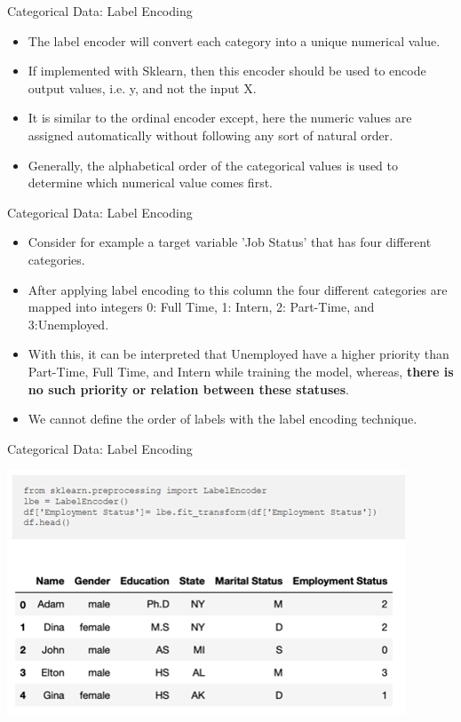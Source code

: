 \documentclass[11pt]{beamer}
\begin{document}
\begin{frame}{Categorical Data: Label Encoding}
	\begin{itemize}
		\item The label encoder will convert each category into a unique numerical value. 
		\item If implemented with Sklearn, then this encoder should be used to encode output values, i.e. y, and not the input X. 
		\item It is similar to the ordinal encoder except, here the numeric values are assigned automatically without following any sort of natural order. 
		\item Generally, the alphabetical order of the categorical values is used to determine which numerical value comes first. 
	\end{itemize}
\end{frame}
\begin{frame}{Categorical Data: Label Encoding}
	\begin{itemize}
		\item Consider for example a target variable 'Job Status' that has four different categories. 
		\item After applying label encoding to this column the four different categories are mapped into integers 0: Full Time, 1: Intern, 2: Part-Time, and 3:Unemployed. 
		\item With this, it can be interpreted that Unemployed have a higher priority than Part-Time, Full Time, and Intern while training the model, whereas, \textbf{there is no such priority or relation between these statuses}. 
		\item We cannot define the order of labels with the label encoding technique.
	\end{itemize}
\end{frame}
\begin{frame}{Categorical Data: Label Encoding}
	\begin{center}
	\includegraphics[scale=1]{../05-pictures/lesson-2-1_pic_3.png}
	\end{center}
\end{frame}
\end{document}
